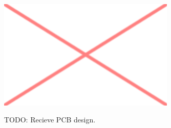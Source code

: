 \begin{figure}[h!]
\centering
\includegraphics[width=0.75\textwidth]{images/placeholder.png}\\
\caption[Recieve PCB]{TODO: Recieve PCB design.}
\label{fig:tag_ed_rec}
\end{figure}



















